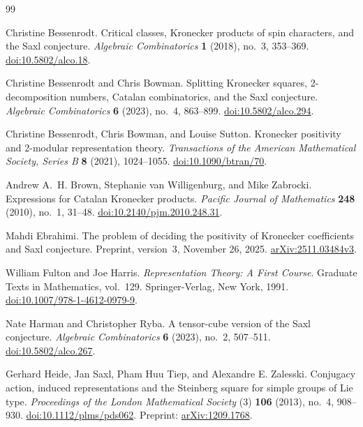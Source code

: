 \begin{thebibliography}{99}

Christine Bessenrodt.
Critical classes, Kronecker products of spin characters, and the Saxl conjecture.
\emph{Algebraic Combinatorics} \textbf{1} (2018), no.~3, 353--369.
\href{https://doi.org/10.5802/alco.18}{doi:10.5802/alco.18}.

Christine Bessenrodt and Chris Bowman.
Splitting Kronecker squares, 2-decomposition numbers, Catalan combinatorics,
and the Saxl conjecture.
\emph{Algebraic Combinatorics} \textbf{6} (2023), no.~4, 863--899.
\href{https://doi.org/10.5802/alco.294}{doi:10.5802/alco.294}.

Christine Bessenrodt, Chris Bowman, and Louise Sutton.
Kronecker positivity and 2-modular representation theory.
\emph{Transactions of the American Mathematical Society, Series B}
\textbf{8} (2021), 1024--1055.
\href{https://doi.org/10.1090/btran/70}{doi:10.1090/btran/70}.

Andrew A.~H. Brown, Stephanie van Willigenburg, and Mike Zabrocki.
Expressions for Catalan Kronecker products.
\emph{Pacific Journal of Mathematics} \textbf{248} (2010), no.~1, 31--48.
\href{https://doi.org/10.2140/pjm.2010.248.31}{doi:10.2140/pjm.2010.248.31}.

Mahdi Ebrahimi.
The problem of deciding the positivity of Kronecker coefficients and Saxl conjecture.
Preprint, version~3, November 26, 2025.
\href{https://arxiv.org/abs/2511.03484v3}{arXiv:2511.03484v3}.

William Fulton and Joe Harris.
\emph{Representation Theory: A First Course}.
Graduate Texts in Mathematics, vol.~129.
Springer-Verlag, New York, 1991.
\href{https://doi.org/10.1007/978-1-4612-0979-9}{doi:10.1007/978-1-4612-0979-9}.

Nate Harman and Christopher Ryba.
A tensor-cube version of the Saxl conjecture.
\emph{Algebraic Combinatorics} \textbf{6} (2023), no.~2, 507--511.
\href{https://doi.org/10.5802/alco.267}{doi:10.5802/alco.267}.

Gerhard Heide, Jan Saxl, Pham Huu Tiep, and Alexandre E. Zalesski.
Conjugacy action, induced representations and the Steinberg square for
simple groups of Lie type.
\emph{Proceedings of the London Mathematical Society} (3)
\textbf{106} (2013), no.~4, 908--930.
\href{https://doi.org/10.1112/plms/pds062}{doi:10.1112/plms/pds062}.
Preprint: \href{https://arxiv.org/abs/1209.1768}{arXiv:1209.1768}.


\end{thebibliography}
